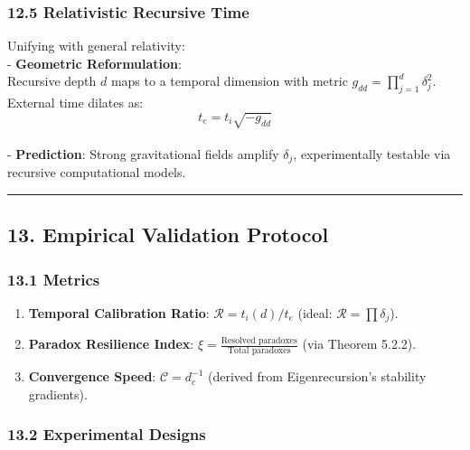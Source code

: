 \documentclass[
]{article}
\providecommand{\tightlist}{%
  \setlength{\itemsep}{0pt}\setlength{\parskip}{0pt}}
\begin{document}
\subsubsection{\texorpdfstring{\textbf{12.5 Relativistic Recursive
Time}}{12.5 Relativistic Recursive Time}}\label{relativistic-recursive-time}

Unifying with general relativity:\\
- \textbf{Geometric Reformulation}:\\
Recursive depth \(d\) maps to a temporal dimension with metric
\(g_{dd} = \prod_{j=1}^d \delta_j^2\). External time dilates as:\\
\[t_e = t_i \sqrt{-g_{dd}}\]\\
- \textbf{Prediction}: Strong gravitational fields amplify \(\delta_j\),
experimentally testable via recursive computational models.

\begin{center}\rule{0.5\linewidth}{0.5pt}\end{center}

\subsection{\texorpdfstring{\textbf{13. Empirical Validation
Protocol}}{13. Empirical Validation Protocol}}\label{empirical-validation-protocol}

\subsubsection{\texorpdfstring{\textbf{13.1
Metrics}}{13.1 Metrics}}\label{metrics}

\begin{enumerate}
\def\labelenumi{\arabic{enumi}.}
\tightlist
\item
  \textbf{Temporal Calibration Ratio}: \(\mathcal{R} = t_i(d)/t_e\)
  (ideal: \(\mathcal{R} = \prod \delta_j\)).\\
\item
  \textbf{Paradox Resilience Index}:
  \(\xi = \frac{\text{Resolved paradoxes}}{\text{Total paradoxes}}\)
  (via Theorem 5.2.2).\\
\item
  \textbf{Convergence Speed}: \(\mathcal{C} = d_c^{-1}\) (derived from
  Eigenrecursion's stability gradients).
\end{enumerate}

\subsubsection{\texorpdfstring{\textbf{13.2 Experimental
Designs}}{13.2 Experimental Designs}}\label{experimental-designs}
\end{document}
